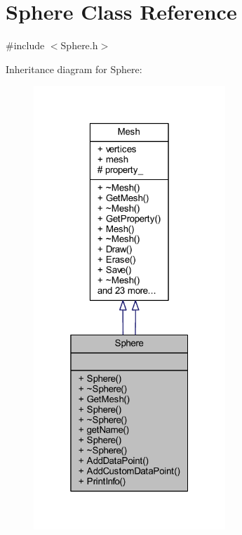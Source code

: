\hypertarget{class_sphere}{}\section{Sphere Class Reference}
\label{class_sphere}


{\ttfamily \#include $<$Sphere.\+h$>$}



Inheritance diagram for Sphere\+:
\nopagebreak
\begin{figure}[H]
\begin{center}
\leavevmode
\includegraphics[width=205pt]{class_sphere__inherit__graph}
\end{center}
\end{figure}


